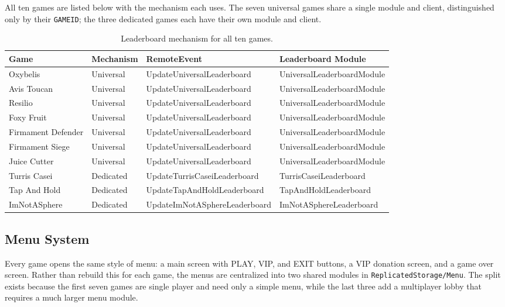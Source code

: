 \documentclass[12pt,letterpaper]{article}
\begin{document}
All ten games are listed below with the mechanism each uses. The seven universal games share a single module and client, distinguished only by their \texttt{GAMEID}; the three dedicated games each have their own module and client.

\begin{table}[H]
\centering
\footnotesize
\begin{tabular}{|p{2.7cm}|p{2cm}|p{4.3cm}|p{4cm}|}
\hline
\textbf{Game} & \textbf{Mechanism} & \textbf{RemoteEvent} & \textbf{Leaderboard Module} \\
\hline
Oxybelis & Universal & UpdateUniversalLeaderboard & UniversalLeaderboardModule \\
\hline
Avis Toucan & Universal & UpdateUniversalLeaderboard & UniversalLeaderboardModule \\
\hline
Resilio & Universal & UpdateUniversalLeaderboard & UniversalLeaderboardModule \\
\hline
Foxy Fruit & Universal & UpdateUniversalLeaderboard & UniversalLeaderboardModule \\
\hline
Firmament Defender & Universal & UpdateUniversalLeaderboard & UniversalLeaderboardModule \\
\hline
Firmament Siege & Universal & UpdateUniversalLeaderboard & UniversalLeaderboardModule \\
\hline
Juice Cutter & Universal & UpdateUniversalLeaderboard & UniversalLeaderboardModule \\
\hline
Turris Casei & Dedicated & UpdateTurrisCaseiLeaderboard & TurrisCaseiLeaderboard \\
\hline
Tap And Hold & Dedicated & UpdateTapAndHoldLeaderboard & TapAndHoldLeaderboard \\
\hline
ImNotASphere & Dedicated & UpdateImNotASphereLeaderboard & ImNotASphereLeaderboard \\
\hline
\end{tabular}
\caption{Leaderboard mechanism for all ten games.}
\end{table}

\clearpage

\subsection{Menu System}

Every game opens the same style of menu: a main screen with PLAY, VIP, and EXIT buttons, a VIP donation screen, and a game over screen. Rather than rebuild this for each game, the menus are centralized into two shared modules in \texttt{ReplicatedStorage/Menu}. The split exists because the first seven games are single player and need only a simple menu, while the last three add a multiplayer lobby that requires a much larger menu module.
\end{document}
